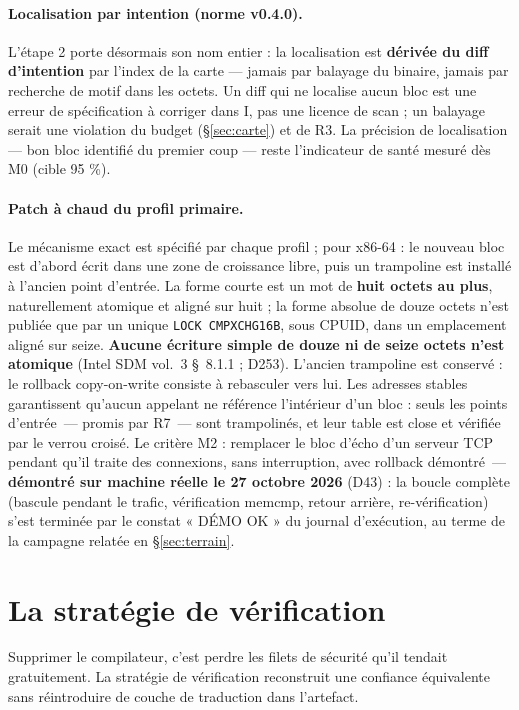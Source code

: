 \paragraph{Localisation par intention (norme v0.4.0).} L’étape 2 porte désormais son nom
entier : la localisation est \textbf{dérivée du diff d’intention} par l’index de la carte
— jamais par balayage du binaire, jamais par recherche de motif dans les octets. Un diff
qui ne localise aucun bloc est une erreur de spécification à corriger dans I, pas une
licence de scan ; un balayage serait une violation du budget (§\ref{sec:carte}) et de R3.
La précision de localisation — bon bloc identifié du premier coup — reste l’indicateur de
santé mesuré dès M0 (cible 95 \%).

\paragraph{Patch à chaud du profil primaire.} Le mécanisme exact est spécifié par chaque
profil ; pour x86-64 : le nouveau bloc est d’abord écrit dans une zone de croissance
libre, puis un trampoline est installé à l’ancien point d’entrée. La forme courte est un
mot de \textbf{huit octets au plus}, naturellement atomique et aligné sur huit ; la forme
absolue de douze octets n’est publiée que par un unique \texttt{LOCK CMPXCHG16B}, sous
CPUID, dans un emplacement aligné sur seize. \textbf{Aucune écriture simple de douze ni
de seize octets n’est atomique} (Intel SDM vol.~3 §~8.1.1 ; D253). L’ancien trampoline
est conservé : le rollback copy-on-write consiste à rebasculer vers lui. Les adresses
stables garantissent qu’aucun appelant ne référence l’intérieur d’un bloc : seuls les
points d’entrée~— promis par R7~— sont trampolinés, et leur table est close et vérifiée
par le verrou croisé. Le critère M2 : remplacer le bloc d’écho d’un serveur TCP pendant
qu’il traite des connexions, sans interruption, avec rollback démontré~— \textbf{démontré
sur machine réelle le 27 octobre 2026} (D43) : la boucle complète (bascule pendant le
trafic, vérification memcmp, retour arrière, re-vérification) s’est terminée par le
constat « DÉMO OK » du journal d’exécution, au terme de la campagne relatée en
§\ref{sec:terrain}.

\section{La stratégie de vérification}\label{sec:verification}

Supprimer le compilateur, c’est perdre les filets de sécurité qu’il tendait gratuitement.
La stratégie de vérification reconstruit une confiance équivalente sans réintroduire de
couche de traduction dans l’artefact.

